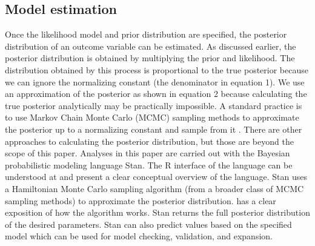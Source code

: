 \documentclass{article}
\begin{document}
\subsection{Model estimation}
Once the likelihood model and prior distribution are specified, the posterior distribution of an outcome variable can be estimated. As discussed earlier, the posterior distribution is obtained by multiplying the prior and likelihood. The distribution obtained by this process is proportional to the true posterior because we can ignore the normalizing constant (the denominator in equation 1). We use an approximation of the posterior as shown in equation 2 because calculating the true posterior analytically may be practically impossible.  A standard practice is to use Markov Chain Monte Carlo (MCMC) sampling methods to approximate the posterior up to a normalizing constant and sample from it \cite{gelman2014bayesian}. There are  other approaches to calculating the posterior distribution, but those are beyond the scope of this paper. Analyses in this paper are carried out with the Bayesian probabilistic modeling language Stan. The R interface of the language can be understood at  and  present a clear conceptual overview of the language. Stan uses a Hamiltonian Monte Carlo sampling algorithm (from a broader class of MCMC sampling methods) to approximate the posterior distribution.  has a clear exposition of how the algorithm works. Stan returns the full posterior distribution of the desired parameters. Stan can also predict values based on the specified model which can be used for model checking, validation, and expansion.
\end{document}
